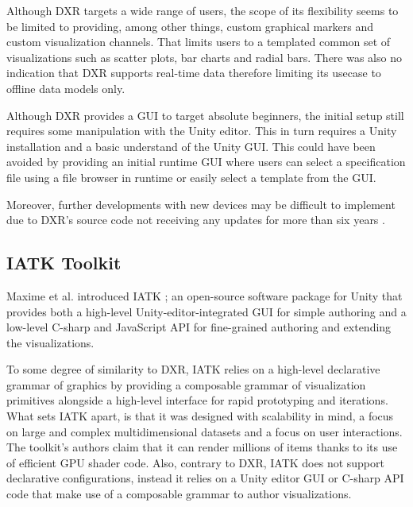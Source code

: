 \documentclass{vgtc}                          %
\begin{document}
\medskip

\noindent Although DXR targets a wide range of users, the scope of its flexibility seems to be limited to
providing, among other things, custom graphical markers and custom visualization channels. That limits users
to a templated common set of visualizations such as scatter plots, bar charts and radial bars. There was also
no indication that DXR supports real-time data therefore limiting its usecase to offline data models only.

\medskip

\noindent Although DXR provides a GUI to target absolute beginners, the initial setup still requires some
manipulation with the Unity editor. This in turn requires a Unity installation and a basic understand of the
Unity GUI. This could have been avoided by providing an initial runtime GUI where users can select a
specification file using a file browser in runtime or easily select a template from the GUI.

\medskip

\noindent Moreover, further developments with new devices may be difficult to implement due to DXR's source
code not receiving any updates for more than six years \cite{dxr:repo}.

\subsection{IATK Toolkit}
Maxime et al. introduced IATK \cite{iatk_toolkit}; an open-source \cite{iatk:repo} software package for Unity
that provides both a high-level Unity-editor-integrated GUI for simple authoring and a low-level C-sharp
and JavaScript API for fine-grained authoring and extending the visualizations.

\smallskip

\noindent To some degree of similarity to DXR, IATK relies on a high-level
declarative grammar of graphics by providing a composable grammar of
visualization primitives alongside a high-level interface for rapid prototyping
and iterations. What sets IATK apart, is that it was designed with scalability
in mind, a focus on large and complex multidimensional datasets and a focus on
user interactions. The toolkit's authors claim that it can render millions of
items thanks to its use of efficient GPU shader code. Also, contrary to DXR,
IATK does not support declarative configurations, instead it relies on a Unity
editor GUI or C-sharp API code that make use of a composable grammar to author
visualizations.
\end{document}
